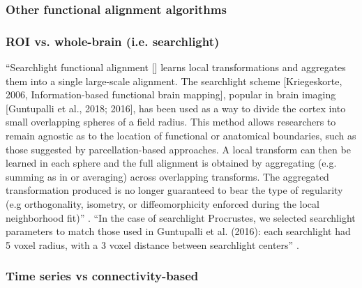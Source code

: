 \subsubsection{Other functional alignment algorithms}



\subsubsection{ROI vs. whole-brain (i.e. searchlight)}




``Searchlight functional alignment [\citep{zhang2016searchlight,
guntupalli2016model}] learns local transformations and aggregates them into a
single large-scale alignment.
%
The searchlight scheme [Kriegeskorte, 2006, Information-based functional brain
mapping], popular in brain imaging [Guntupalli et al., 2018; 2016], has been
used as a way to divide the cortex into small overlapping spheres of a field
radius.
%
This method allows researchers to remain agnostic as to the location of
functional or anatomical boundaries, such as those suggested by
parcellation-based approaches.
%
A local transform can then be learned in each sphere and the full alignment is
obtained by aggregating (e.g. summing as in \citep{guntupalli2016model} or
averaging) across overlapping transforms.
%
The aggregated transformation produced is no longer guaranteed to bear the type
of regularity (e.g orthogonality, isometry, or diffeomorphicity enforced during
the local neighborhood fit)'' \citep{bazeille2021empirical}.
%
``In the case of searchlight Procrustes, we selected searchlight parameters to
match those used in Guntupalli et al. (2016):
%
each searchlight had 5 voxel radius, with a 3 voxel distance between searchlight
centers'' \citep{bazeille2021empirical}.


\subsubsection{Time series vs connectivity-based}

